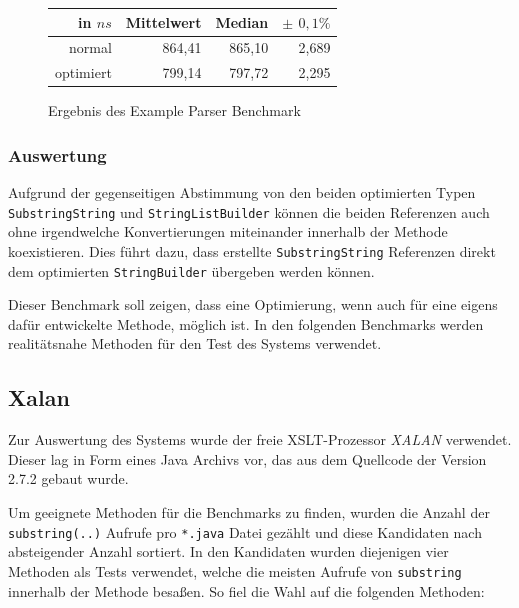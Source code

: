 \begin{figure}[H]
{	}

	
	\begin{table}[H]
	\centering
		\begin{tabular}{|r|r|r|r|}
			\hline
		   	in $ns$   & Mittelwert & Median & \bf{$\pm$ $0,1\%$} \\
		 	\hline
		 	\hline
		 	normal    & 864,41 & 865,10 & 2,689 \\ 
		  	optimiert & 799,14 & 797,72 & 2,295 \\
		  	\hline
		  	
		\end{tabular}
	\end{table}

	\caption{Ergebnis des Example Parser Benchmark}\label{bp:exampleBench}
\end{figure}


\subsubsection{Auswertung}

Aufgrund der gegenseitigen Abstimmung von den beiden optimierten Typen \texttt{SubstringString} und
\texttt{StringListBuilder} können die beiden Referenzen auch ohne irgendwelche 
Konvertierungen miteinander innerhalb der Methode koexistieren. Dies führt dazu, dass
erstellte \texttt{SubstringString} Referenzen direkt dem optimierten \texttt{StringBuilder} übergeben
werden können. 

Dieser Benchmark soll zeigen, dass eine Optimierung, wenn auch für eine eigens dafür 
entwickelte Methode, möglich ist. In den folgenden Benchmarks werden realitätsnahe Methoden für 
den Test des Systems verwendet.
 
\subsection{Xalan}

Zur Auswertung des Systems wurde der freie XSLT-Prozessor \textit{XALAN} verwendet. Dieser lag in Form 
eines Java Archivs vor, das aus dem Quellcode der Version 2.7.2 gebaut wurde. 

Um geeignete Methoden für die Benchmarks zu finden, wurden die Anzahl der \texttt{substring(..)}
Aufrufe pro \texttt{*.java} Datei gezählt und diese Kandidaten nach absteigender Anzahl sortiert.
In den Kandidaten wurden diejenigen vier Methoden als Tests verwendet, welche die meisten 
Aufrufe von \texttt{substring} innerhalb der Methode besaßen. So fiel die Wahl auf die folgenden 
Methoden:

